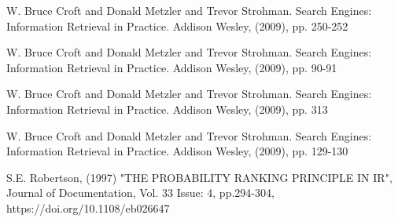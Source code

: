 \documentclass[runningheads]{llncs}
\begin{document}
\vskip 1.5in
%

\begin{thebibliography}{8}

W. Bruce Croft and Donald Metzler and Trevor Strohman. Search Engines: Information Retrieval in Practice. Addison Wesley, (2009), pp. 250-252

W. Bruce Croft and Donald Metzler and Trevor Strohman. Search Engines: Information Retrieval in Practice. Addison Wesley, (2009), pp. 90-91

W. Bruce Croft and Donald Metzler and Trevor Strohman. Search Engines: Information Retrieval in Practice. Addison Wesley, (2009), pp. 313

W. Bruce Croft and Donald Metzler and Trevor Strohman. Search Engines: Information Retrieval in Practice. Addison Wesley, (2009), pp. 129-130

S.E. Robertson, (1997) "THE PROBABILITY RANKING PRINCIPLE IN IR", Journal of Documentation, Vol. 33 Issue: 4, pp.294-304, https://doi.org/10.1108/eb026647

\end{thebibliography}

\begin{figure}[h!]
\end{figure}
\end{document}
